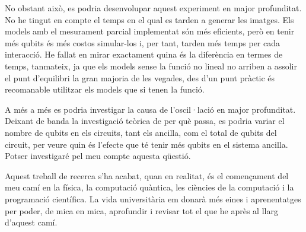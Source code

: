 No obstant això, es podria desenvolupar aquest experiment en major profunditat. No he tingut en compte el temps en el qual es tarden a generar les imatges. Els models amb el mesurament parcial implementat són més eficients, però en tenir més qubits és més costos simular-los i, per tant, tarden més temps per cada interacció. He fallat en mirar exactament quina és la diferència en termes de temps, tanmateix, ja que els models sense la funció no lineal no arriben a assolir el punt d'equilibri la gran majoria de les vegades, des d'un punt pràctic és recomanable utilitzar els models que si tenen la funció. 

A més a més es podria investigar la causa de l'oscil·lació en major profunditat. Deixant de banda la investigació teòrica de per què passa, es podria variar el nombre de qubits en els circuits, tant els ancilla, com el total de qubits del circuit, per veure quin és l'efecte que té tenir més qubits en el sistema ancilla. Potser investigaré pel meu compte aquesta qüestió. 

Aquest treball de recerca s'ha acabat, quan en realitat, és el començament del meu camí en la física, la computació quàntica, les ciències de la computació i la programació científica. La vida universitària em donarà més eines i aprenentatges per poder, de mica en mica, aprofundir i revisar tot el que he après al llarg d'aquest camí. 










